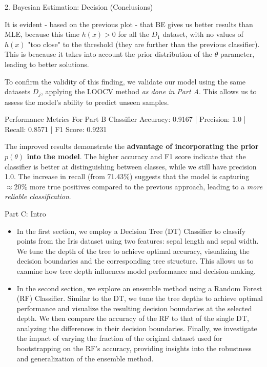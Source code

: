 \documentclass[aspectratio=169,xcolor=dvipsnames]{beamer}
\begin{document}
\begin{frame}{2. Bayesian Estimation: Decision (Conclusions)}

    It is evident - based on the previous plot - that BE gives us better results than MLE, because this time $h(x) > 0$ for all the $D_1$ dataset, with no values of $h(x)$ "too close" to the threshold (they are further than the previous classifier). This is beacause it takes into account the prior distribution of the $\theta$ parameter, leading to better solutions.

    \vspace{5pt}

    To confirm the validity of this finding, we validate our model using the same datasets $D_j$, applying the LOOCV method \textit{as done in Part A}. This allows us to assess the model's ability to predict unseen samples. 

    \begin{block}{Performance Metrics For Part B Classifier}
        Accuracy:  0.9167 |
        Precision: 1.0 |
        Recall:    0.8571 |
        F1 Score:  0.9231
    \end{block}

    The improved results demonstrate the \textbf{advantage of incorporating the prior $p(\theta)$ into the model}. The higher accuracy and F1 score indicate that the classifier is better at distinguishing between classes, while we still have precision 1.0. The increase in recall (from 71.43\%) suggests that the model is capturing  $\approx20\%$ more true positives compared to the previous approach, leading to a \textit{more reliable classification}.

\end{frame}

\begin{frame}{Part C: Intro}
    \begin{itemize}
        \item In the first section, we employ a Decision Tree (DT) Classifier to classify points from the Iris dataset 
        using two features: sepal length and sepal width. We tune the depth of the tree to achieve optimal accuracy,
        visualizing the decision boundaries and the corresponding tree structure. This allows us to examine how 
        tree depth influences model performance and decision-making.

        \item In the second section, we explore an ensemble method using a Random Forest (RF) Classifier. 
        Similar to the DT, we tune the tree depths to achieve optimal performance and visualize the resulting 
        decision boundaries at the selected depth. We then compare the accuracy of the RF to that of the single DT,
        analyzing the differences in their decision boundaries. Finally, we investigate the impact of varying the 
        fraction of the original dataset used for bootstrapping on the RF's accuracy, providing insights into the 
        robustness and generalization of the ensemble method.
    \end{itemize}
\end{frame}
\end{document}
